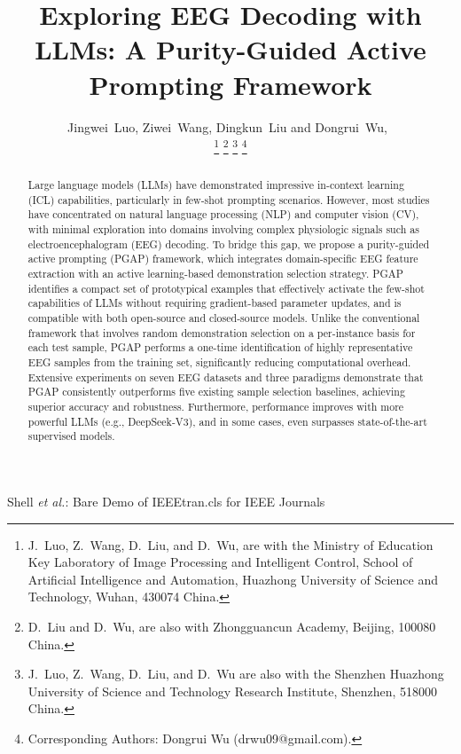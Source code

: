 \documentclass[journal,twocolumn]{IEEEtran}
\begin{document}
\title{Exploring EEG Decoding with LLMs: A Purity-Guided Active Prompting Framework}

\author{Jingwei~Luo, Ziwei~Wang, Dingkun~Liu and Dongrui~Wu,~

\thanks{J.~Luo, Z.~Wang, D.~Liu, and D.~Wu, are with the Ministry of Education Key Laboratory of Image Processing and Intelligent Control, School of Artificial Intelligence and Automation, Huazhong University of Science and Technology, Wuhan, 430074 China.}
\thanks{D.~Liu and D.~Wu, are also with Zhongguancun Academy, Beijing, 100080 China.}
\thanks{J.~Luo, Z.~Wang, D.~Liu, and D.~Wu are also with the Shenzhen Huazhong University of Science and Technology Research Institute, Shenzhen, 518000 China.}
\thanks{Corresponding Authors: Dongrui Wu (drwu09@gmail.com).}
}
\markboth{}%
{Shell \MakeLowercase{\textit{et al.}}: Bare Demo of IEEEtran.cls for IEEE Journals}
\maketitle

\begin{abstract}
Large language models (LLMs) have demonstrated impressive in-context learning (ICL) capabilities, particularly in few-shot prompting scenarios. However, most studies have concentrated on natural language processing (NLP) and computer vision (CV), with minimal exploration into domains involving complex physiologic signals such as electroencephalogram (EEG) decoding.
To bridge this gap, we propose a purity-guided active prompting (PGAP) framework, which integrates domain-specific EEG feature extraction with an active learning-based demonstration selection strategy. PGAP identifies a compact set of prototypical examples that effectively activate the few-shot capabilities of LLMs without requiring gradient-based parameter updates, and is compatible with both open-source and closed-source models.
Unlike the conventional framework that involves random demonstration selection on a per-instance basis for each test sample, PGAP performs a one-time identification of highly representative EEG samples from the training set, significantly reducing computational overhead.
Extensive experiments on seven EEG datasets and three paradigms demonstrate that PGAP consistently outperforms five existing sample selection baselines, achieving superior accuracy and robustness. Furthermore, performance improves with more powerful LLMs (e.g., DeepSeek-V3), and in some cases, even surpasses state-of-the-art supervised models.
\end{abstract}
\end{document}
